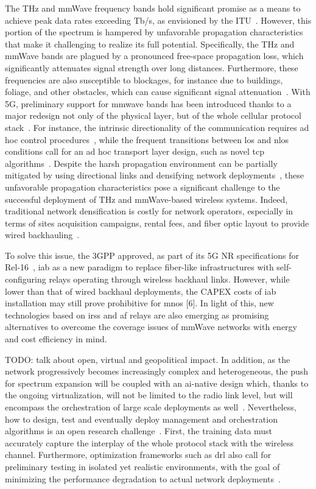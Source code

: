 The THz and mmWave frequency bands hold significant promise as a means to achieve peak data rates exceeding Tb/s, as envisioned by the ITU~\cite{imt2030}. However, this portion of the spectrum is hampered by unfavorable propagation characteristics that make it challenging to realize its full potential.
Specifically, the THz and mmWave bands are plagued by a pronounced free-space propagation loss, which significantly attenuates signal strength over long distances. Furthermore, these frequencies are also susceptible to blockages, for instance due to buildings, foliage, and other obstacles, which can cause significant signal attenuation~\cite{han2018propagation, jornet2011channel}.
With 5G, preliminary support for \gls{mmwave} bands has been introduced thanks to a major redesign not only of the physical layer, but of the whole cellular protocol stack~\cite{shafi2018microwave}. For instance, the intrinsic directionality of the communication requires ad hoc control procedures~\cite{heng2021six}, while the frequent transitions between \gls{los} and \gls{nlos} conditions call for an ad hoc transport layer design, such as novel \gls{tcp} algorithms~\cite{zhang2019will}. 
Despite the harsh propagation environment can be partially mitigated by using directional links and densifying network deployments~\cite{polese2020toward}, these unfavorable propagation characteristics pose a significant challenge to the successful deployment of THz and mmWave-based wireless systems. Indeed, traditional network densification is costly for network operators,
especially in terms of sites acquisition campaigns, rental fees, and fiber optic layout to provide wired backhauling~\cite{lopez2015towards}.

To solve this issue, the 3GPP approved, as part of its 5G NR specifications for Rel-16~\cite{3gpp_38_874}, \gls{iab} as a new paradigm to replace fiber-like infrastructures with self-configuring relays operating through wireless backhaul links. However, while lower than that of wired backhaul deployments, the CAPEX costs of \gls{iab} installation may still prove prohibitive for \glspl{mno} [6].
In light of this, new technologies based on \glspl{irs} and \gls{af} relays are also emerging as promising alternatives to overcome the coverage issues of mmWave networks with energy and cost efficiency in mind.

TODO: talk about open, virtual and geopolitical impact.
In addition, as the network progressively becomes increasingly complex and heterogeneous, the push for spectrum expansion will be coupled with an \gls{ai}-native design which, thanks to the ongoing virtualization, will not be limited to the radio link level, but will encompass the orchestration of large scale deployments as well~\cite{polese2023understanding}.
Nevertheless, how to design, test and eventually deploy management and orchestration algorithms is an open research challenge~\cite{polese2022colo}.
First, the training data must accurately capture the interplay of the whole protocol stack with the wireless channel. Furthermore, optimization frameworks such as \gls{drl} also call for preliminary testing in isolated yet realistic environments, with the goal of minimizing the performance degradation to actual network deployments~\cite{lacava2022programmable, amir2023safehaul}.



